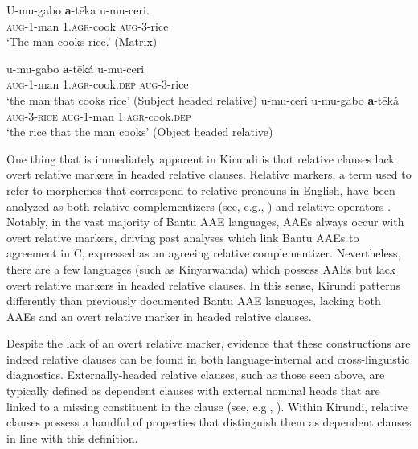 \documentclass[output=paper,colorlinks,citecolor=brown
]{langscibook}
\begin{document}
\ea \label{ex:myers:matrix} \gll 	U-mu-gabo {\bfseries  a}-tēka u-mu-ceri. \\
			\textsc{aug}-1-man \textsc{1.agr}-cook  \textsc{aug}-3-rice\\
			\glt `The man cooks rice.'  \hfill{(Matrix)}
			\z

\ea \label{ex:myers:subobj}
\begin{xlist}			
\ex		\gll	u-mu-gabo {\bfseries  a}-tēká u-mu-ceri \\
\textsc{aug}-1-man  \textsc{1.agr}-cook.\textsc{dep} \textsc{aug}-3-rice \\
		\glt `the man that cooks rice' \hfill{(Subject headed relative)} 
\ex	 \gll u-mu-ceri u-mu-gabo {\bfseries  a}-tēká \\
		\textsc{aug-3-rice} \textsc{aug}-1-man \textsc{1.agr}-cook.\textsc{dep}  \\
		\glt `the rice that the man cooks' \hfill{(Object headed relative)} 
\end{xlist}
\z

One thing that is immediately apparent in Kirundi is that relative clauses lack overt relative markers in headed relative clauses. Relative markers, a term used to refer to morphemes that correspond to relative pronouns in English, have been analyzed as both relative complementizers (see, e.g., \citealt{DemuthHarford:1999,SchneiderZioga:2007,BHenderson:2009}) and relative operators \citep{Jenksetal:2017}. Notably, in the vast majority of Bantu AAE languages, AAEs always occur with overt relative markers, driving past analyses which link Bantu AAEs to agreement in C, expressed as an agreeing relative complementizer. Nevertheless, there are a few languages (such as Kinyarwanda) which possess AAEs but lack overt relative markers in headed relative clauses. In this sense, Kirundi patterns differently than previously documented Bantu AAE languages, lacking both AAEs and an overt relative marker in headed relative clauses.

Despite the lack of an overt relative marker, evidence that these constructions are indeed relative clauses can be found in both language-internal and cross-linguistic diagnostics. Externally-headed relative clauses, such as those seen above, are typically defined as dependent clauses with external nominal heads that are linked to a missing constituent in the clause (see, e.g., \citealt[23]{Caponigro:2021}). Within Kirundi, relative clauses possess a handful of properties that distinguish them as dependent clauses in line with this definition.
\end{document}
